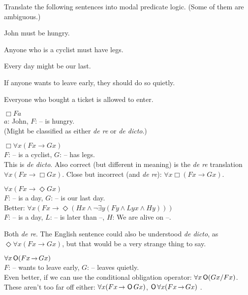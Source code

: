 \begin{exercise}
  Translate the following sentences into modal predicate logic. (Some of them
  are ambiguous.)
  \begin{exlist}
  \item John must be hungry.
  \item Anyone who is a cyclist must have legs.
  \item Every day might be our last.
  \item If anyone wants to leave early, they should do so quietly.
  \item Everyone who bought a ticket is allowed to enter.
  \end{exlist}
\end{exercise}
\begin{solution}

  \begin{sollist}
    \item $\Box Fa$ \\ $a$: John, $F$: -- is hungry.\\[1mm]
    (Might be classified as either \emph{de re} or \emph{de dicto}.)\\[-2mm]
    
  \item $\Box \forall x(Fx \to Gx)$ \\ $F$: -- is a cyclist, $G$: -- has legs.\\[1mm]
    This is \emph{de dicto}. Also correct (but different in meaning) is the \emph{de re} translation $\forall x (Fx \to \Box Gx)$.
    Close but incorrect (and \emph{de re}): $\forall x \Box(Fx \to Gx)$.\\[-2mm] 
    
  \item $\forall x (Fx \to \Diamond Gx)$ \\ $F$: -- is a day, $G$: -- is our last day.\\[1mm]
  Better:
  $\forall x (Fx \to \Diamond (Hx \land \neg \exists y(Fy \land Lyx \land Hy)))$ \\ $F$: -- is a day, $L$: -- is later than --, $H$: We are alive on --.
  
    Both \emph{de re}. The English sentence could also be understood \emph{de dicto}, as 
    $\Diamond \forall x (Fx \to Gx)$, but that would be a very strange
    thing to say.\\[-2mm]
    
  \item %
    $\forall x \Ob(Fx \to Gx)$\\
    $F$: -- wants to leave early, $G$: -- leaves quietly.\\[1mm]
    Even better, if we can use the conditional obligation operator: $\forall x \operatorname{\mathsf{O}}(Gx / Fx)$. These aren't too far off either:
    $\forall x (Fx \to \Ob Gx)$, $\Ob\forall x(Fx \to Gx)$ .


\end{sollist}
\end{solution}
